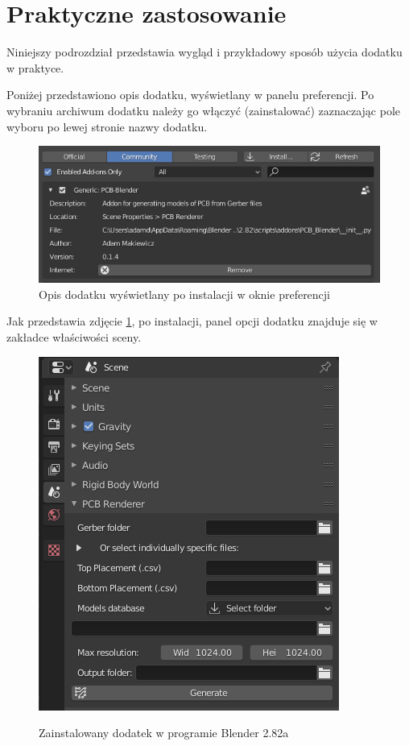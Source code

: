 \documentclass{xmgr}
\begin{document}
\section{Praktyczne zastosowanie}

Niniejszy podrozdział przedstawia wygląd i przykładowy sposób użycia dodatku w praktyce.

Poniżej przedstawiono opis dodatku, wyświetlany w panelu preferencji. Po wybraniu archiwum dodatku należy go włączyć (zainstalować) zaznaczając pole wyboru po lewej stronie nazwy dodatku. 
\begin{figure}[!tbh]
\centering
\includegraphics[width=1\hsize]{fig/addon_prefs}
\caption{Opis dodatku wyświetlany po instalacji w oknie preferencji}
\end{figure}

Jak przedstawia zdjęcie \ref{img2}, po instalacji, panel opcji dodatku znajduje się w zakładce właściwości sceny.

\begin{figure}
\centering
\includegraphics[width=0.75\hsize]{fig/addon_panel}
\caption{Zainstalowany dodatek w programie Blender 2.82a}
 \label{img2}
\end{figure}
\end{document}
